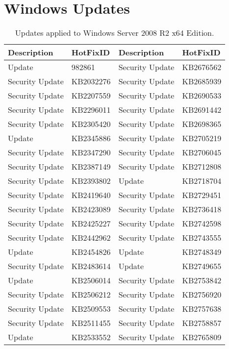 \chapter{Windows Updates} \label{app:updates}
\begin{longtable}{ l | l || l | l } 
  \caption{Updates applied to Windows Server 2008 R2 x64 Edition.}
  \label{tab:Updates}
  \endfirsthead
  \endhead
  Description      & HotFixID   & Description      & HotFixID   \\ \hline
  Update           & 982861     & Security Update  & KB2676562  \\ 
  Security Update  & KB2032276  & Security Update  & KB2685939  \\ 
  Security Update  & KB2207559  & Security Update  & KB2690533  \\ 
  Security Update  & KB2296011  & Security Update  & KB2691442  \\
  Security Update  & KB2305420  & Security Update  & KB2698365  \\
  Update           & KB2345886  & Security Update  & KB2705219  \\
  Security Update  & KB2347290  & Security Update  & KB2706045  \\
  Security Update  & KB2387149  & Security Update  & KB2712808  \\
  Security Update  & KB2393802  & Update           & KB2718704  \\
  Security Update  & KB2419640  & Security Update  & KB2729451  \\
  Security Update  & KB2423089  & Security Update  & KB2736418  \\
  Security Update  & KB2425227  & Security Update  & KB2742598  \\
  Security Update  & KB2442962  & Security Update  & KB2743555  \\
  Update           & KB2454826  & Update           & KB2748349  \\
  Security Update  & KB2483614  & Update           & KB2749655  \\
  Update           & KB2506014  & Security Update  & KB2753842  \\
  Security Update  & KB2506212  & Security Update  & KB2756920  \\
  Security Update  & KB2509553  & Security Update  & KB2757638  \\
  Security Update  & KB2511455  & Security Update  & KB2758857  \\
  Update           & KB2533552  & Security Update  & KB2765809  \\

\end{longtable}
